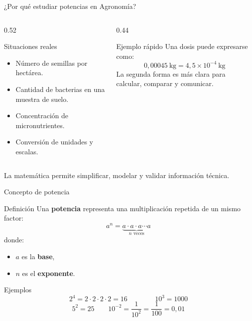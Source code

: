 \documentclass[aspectratio=169,10pt,handout]{beamer}
\newcommand{\destacar}[1]{\textcolor{USTBlueDark}{\textbf{#1}}}
\newcommand{\pp}{\pause}
\begin{document}
	\begin{frame}{¿Por qué estudiar potencias en Agronomía?}
		\begin{columns}[T,totalwidth=\textwidth]
			\begin{column}{0.52\textwidth}
				\begin{block}{Situaciones reales}
					\begin{itemize}
						\item Número de semillas por hectárea.
						\item Cantidad de bacterias en una muestra de suelo.
						\item Concentración de micronutrientes.
						\item Conversión de unidades y escalas.
					\end{itemize}
				\end{block}
			\end{column}
			
			\begin{column}{0.44\textwidth}
				\begin{exampleblock}{Ejemplo rápido}
					Una dosis puede expresarse como:
					\[
					0{,}00045\ \text{kg} = 4{,}5\times 10^{-4}\ \text{kg}
					\]
					La segunda forma es más clara para calcular, comparar y comunicar.
				\end{exampleblock}
			\end{column}
		\end{columns}
		
		\vspace{0.2cm}
		\centering
		{\small \textcolor{WarmGray}{La matemática permite simplificar, modelar y validar información técnica.}}
	\end{frame}
	
	\begin{frame}{Concepto de potencia}
		\begin{block}{Definición}
			Una \destacar{potencia} representa una multiplicación repetida de un mismo factor:
			\[
			a^n = \underbrace{a\cdot a\cdot a\cdots a}_{n \text{ veces}}
			\]
			donde:
			\begin{itemize}
				\item \(a\) es la \destacar{base},
				\item \(n\) es el \destacar{exponente}.
			\end{itemize}
		\end{block}
		
		\pp
		
		\begin{exampleblock}{Ejemplos}
			\[
			2^4 = 2\cdot2\cdot2\cdot2 = 16
			\qquad\qquad
			10^3 = 1000
			\]
			\[
			5^2 = 25
			\qquad
			10^{-2}=\frac{1}{10^2}=\frac{1}{100}=0{,}01
			\]
		\end{exampleblock}
	\end{frame}
	
\end{document}
